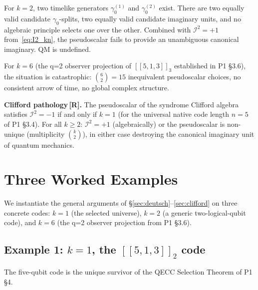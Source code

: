 \documentclass[11pt,a4paper]{article}
\newcommand{\Rmark}{\textcolor{green!50!black}{\textbf{[R]}}}
\newcommand{\Cq}[4]{[\![#1,#2,#3]\!]_{#4}}
\begin{document}
For $k=2$, two timelike generators $\gamma_0^{(1)}$ and $\gamma_0^{(2)}$ exist. There are two equally valid candidate $\gamma_0$-splits, two equally valid candidate imaginary units, and no algebraic principle selects one over the other. Combined with $\mathcal{I}^2=+1$ from~\eqref{eq:I2_kn}, the pseudoscalar fails to provide an unambiguous canonical imaginary. QM is undefined.

For $k=6$ (the q=2 observer projection of $\Cq{5}{1}{3}{3}$ established in P1 \S3.6), the situation is catastrophic: $\binom{6}{2}=15$ inequivalent pseudoscalar choices, no consistent arrow of time, no global complex structure.

\begin{mdframed}[backgroundcolor=Rbg,linecolor=Rcolor,linewidth=1.5pt]
\textbf{Clifford pathology\,\Rmark.}\quad
The pseudoscalar of the syndrome Clifford algebra satisfies $\mathcal{I}^2=-1$ if and only if $k=1$ (for the universal native code length $n=5$ of P1 \S3.4). For all $k\geq2$: $\mathcal{I}^2=+1$ (algebraically) or the pseudoscalar is non-unique (multiplicity $\binom{k}{2}$), in either case destroying the canonical imaginary unit of quantum mechanics.
\end{mdframed}

\section{Three Worked Examples}
\label{sec:examples}

We instantiate the general arguments of \S\ref{sec:deutsch}--\ref{sec:clifford} on three concrete codes: $k=1$ (the selected universe), $k=2$ (a generic two-logical-qubit code), and $k=6$ (the q=2 observer projection from P1 \S3.6).

\subsection{Example 1: $k=1$, the $\Cq{5}{1}{3}{2}$ code}
\label{sec:ex_k1}

The five-qubit code is the unique survivor of the QECC Selection Theorem of P1 \S4.
\end{document}
